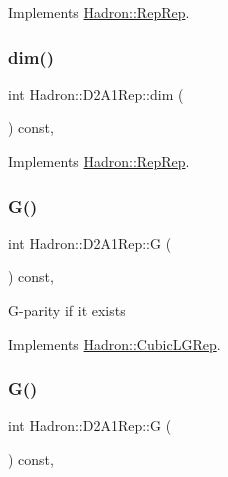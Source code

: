 Implements \mbox{\hyperlink{structHadron_1_1RepRep_a92c8802e5ed7afd7da43ccfd5b7cd92b}{Hadron\+::\+Rep\+Rep}}.

\mbox{\label{structHadron_1_1D2A1Rep_aba72a454b36e387861f8984650234865}} 
\subsubsection{\texorpdfstring{dim()}{dim()}\hspace{0.1cm}{\footnotesize\ttfamily [3/3]}}
{\footnotesize\ttfamily int Hadron\+::\+D2\+A1\+Rep\+::dim (\begin{DoxyParamCaption}{ }\end{DoxyParamCaption}) const\hspace{0.3cm}{\ttfamily [inline]}, {\ttfamily [virtual]}}



Implements \mbox{\hyperlink{structHadron_1_1RepRep_a92c8802e5ed7afd7da43ccfd5b7cd92b}{Hadron\+::\+Rep\+Rep}}.

\mbox{\label{structHadron_1_1D2A1Rep_a6554f360e6246dce7c2d91b786a87519}} 
\subsubsection{\texorpdfstring{G()}{G()}\hspace{0.1cm}{\footnotesize\ttfamily [1/2]}}
{\footnotesize\ttfamily int Hadron\+::\+D2\+A1\+Rep\+::G (\begin{DoxyParamCaption}{ }\end{DoxyParamCaption}) const\hspace{0.3cm}{\ttfamily [inline]}, {\ttfamily [virtual]}}

G-\/parity if it exists 

Implements \mbox{\hyperlink{structHadron_1_1CubicLGRep_ace26f7b2d55e3a668a14cb9026da5231}{Hadron\+::\+Cubic\+L\+G\+Rep}}.

\mbox{\label{structHadron_1_1D2A1Rep_a6554f360e6246dce7c2d91b786a87519}} 
\subsubsection{\texorpdfstring{G()}{G()}\hspace{0.1cm}{\footnotesize\ttfamily [2/2]}}
{\footnotesize\ttfamily int Hadron\+::\+D2\+A1\+Rep\+::G (\begin{DoxyParamCaption}{ }\end{DoxyParamCaption}) const\hspace{0.3cm}{\ttfamily [inline]}, {\ttfamily [virtual]}}

